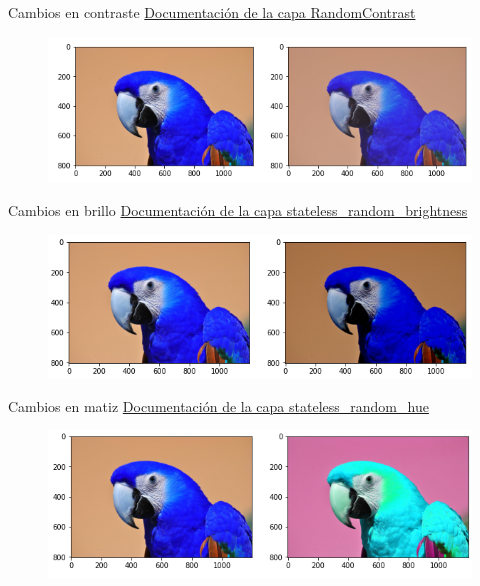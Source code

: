 \begin{frame}{Cambios en contraste}
\textcolor{blue}{\href{https://keras.io/api/layers/preprocessing_layers/image_augmentation/random_contrast/}{Documentación de la capa RandomContrast}}
\begin{figure}
    \centering
    \includegraphics[width=\textwidth]{figures/Tema 3/Contrast.png}
\end{figure}
\end{frame}

\begin{frame}{Cambios en brillo}
\textcolor{blue}{\href{https://www.tensorflow.org/api_docs/python/tf/image/stateless_random_brightness}{Documentación de la capa stateless\_random\_brightness}}
\begin{figure}
    \centering
    \includegraphics[width=\textwidth]{figures/Tema 3/Birghtness.png}
\end{figure}
\end{frame}

\begin{frame}{Cambios en matiz}
\textcolor{blue}{\href{https://www.tensorflow.org/api_docs/python/tf/image/stateless_random_hue}{Documentación de la capa stateless\_random\_hue}}
\begin{figure}
    \centering
    \includegraphics[width=\textwidth]{figures/Tema 3/Hue.png}
\end{figure}
\end{frame}

